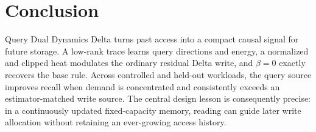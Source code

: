 \documentclass[pdflatex,sn-mathphys-num]{sn-jnl}
\theoremstyle{thmstyleone}
\begin{document}
\section{Conclusion}\label{sec:conclusion}

Query Dual Dynamics Delta turns past access into a compact causal signal for future storage. A low-rank trace learns query directions and energy, a normalized and clipped heat modulates the ordinary residual Delta write, and $\beta=0$ exactly recovers the base rule. Across controlled and held-out workloads, the query source improves recall when demand is concentrated and consistently exceeds an estimator-matched write source. The central design lesson is consequently precise: in a continuously updated fixed-capacity memory, reading can guide later write allocation without retaining an ever-growing access history.

\nocite{*}

\end{document}

